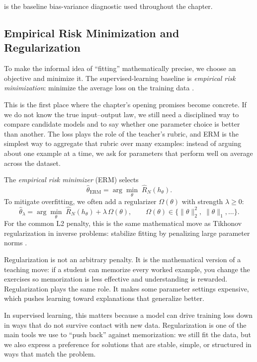  is the baseline bias-variance diagnostic used throughout the chapter.

\subsection{Empirical Risk Minimization and Regularization}
\label{sec:supervised_empirical_risk_minimization_and_regularization}

To make the informal idea of ``fitting'' mathematically precise, we choose an objective and minimize it. The supervised-learning baseline is \emph{empirical risk minimization}: minimize the average loss on the training data \citep{Vapnik1998}.

This is the first place where the chapter's opening promises become concrete. If we do not know the true input--output law, we still need a disciplined way to compare candidate models and to say whether one parameter choice is better than another. The loss plays the role of the teacher's rubric, and ERM is the simplest way to aggregate that rubric over many examples: instead of arguing about one example at a time, we ask for parameters that perform well on average across the dataset.

The \emph{empirical risk minimizer} (ERM) selects
\begin{equation}
\hat\theta_{\text{ERM}} = \arg\min_{\theta} \; \hat R_N(h_\theta).
\label{eq:erm_solution}
\end{equation}
To mitigate overfitting, we often add a regularizer \(\Omega(\theta)\) with strength \(\lambda \ge 0\):
\begin{equation}
\hat\theta_\lambda = \arg\min_{\theta} \; \hat R_N(h_\theta) + \lambda\,\Omega(\theta), \qquad \Omega(\theta) \in \{\|\theta\|_2^2,\; \|\theta\|_1,\ldots\}.
\label{eq:regularized_erm}
\end{equation}
For the common L2 penalty, this is the same mathematical move as Tikhonov regularization in inverse problems: stabilize fitting by penalizing large parameter norms \citep{Tikhonov1963}.

\noindent Regularization is not an arbitrary penalty. It is the mathematical version of a teaching move: if a student can memorize every worked example, you change the exercises so memorization is less effective and understanding is rewarded. Regularization plays the same role. It makes some parameter settings expensive, which pushes learning toward explanations that generalize better.

In supervised learning, this matters because a model can drive training loss down in ways that do not survive contact with new data. Regularization is one of the main tools we use to ``push back'' against memorization: we still fit the data, but we also express a preference for solutions that are stable, simple, or structured in ways that match the problem.


